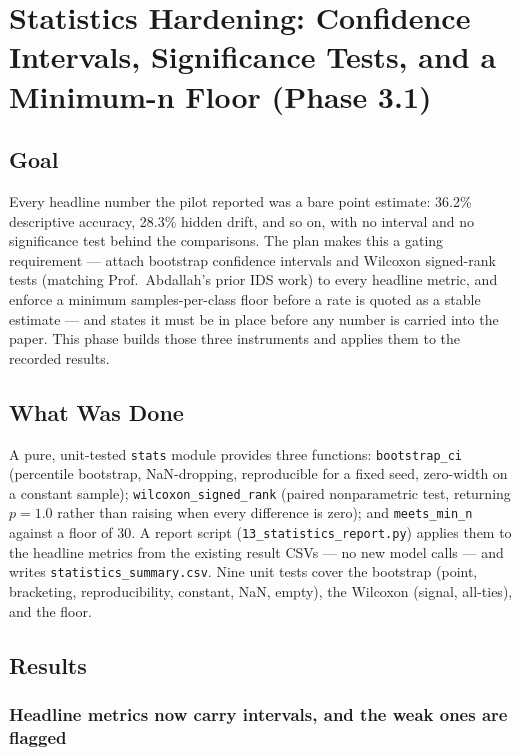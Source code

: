 \chapter{Statistics Hardening: Confidence Intervals, Significance Tests, and a Minimum-n Floor (Phase 3.1)}
\label{chap:p3-1}

\section{Goal}

Every headline number the pilot reported was a bare point estimate: 36.2\% descriptive accuracy,
28.3\% hidden drift, and so on, with no interval and no significance test behind the comparisons. The
plan makes this a gating requirement --- attach bootstrap confidence intervals and Wilcoxon signed-rank
tests (matching Prof.\ Abdallah's prior IDS work) to every headline metric, and enforce a minimum
samples-per-class floor before a rate is quoted as a stable estimate --- and states it must be in place
before any number is carried into the paper. This phase builds those three instruments and applies them
to the recorded results.

\section{What Was Done}

A pure, unit-tested \texttt{stats} module provides three functions: \texttt{bootstrap\_ci} (percentile
bootstrap, NaN-dropping, reproducible for a fixed seed, zero-width on a constant sample);
\texttt{wilcoxon\_signed\_rank} (paired nonparametric test, returning $p=1.0$ rather than raising when
every difference is zero); and \texttt{meets\_min\_n} against a floor of 30. A report script
(\texttt{13\_statistics\_report.py}) applies them to the headline metrics from the existing result CSVs
--- no new model calls --- and writes \texttt{statistics\_summary.csv}. Nine unit tests cover the
bootstrap (point, bracketing, reproducibility, constant, NaN, empty), the Wilcoxon (signal, all-ties),
and the floor.

\section{Results}

\subsection{Headline metrics now carry intervals, and the weak ones are flagged}

